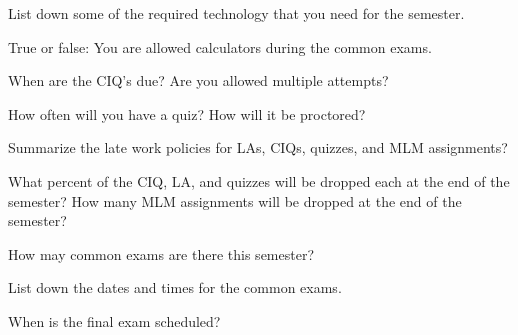 \documentclass{exam}
\numberwithin{equation}{section} %
\numberwithin{figure}{section} %
\numberwithin{table}{section} %
\begin{document}
\begin{questions}
\question List down some of the required technology that you need for the semester.
\begin{solution}[\stretch{2}]

\end{solution}

\question True or false: You are allowed calculators during the common exams.
\begin{solution}[\stretch{1}]

\end{solution}

\question When are the CIQ's due? Are you allowed multiple attempts?%
\begin{solution}[\stretch{1}]

\end{solution}

\question How often will you have a quiz? How will it be proctored?
\begin{solution}[\stretch{1}]

\end{solution}

\newpage

\question Summarize the late work policies for LAs, CIQs, quizzes, and MLM assignments?
\begin{solution}[\stretch{2}]

\end{solution}

\question What percent of the CIQ, LA, and quizzes will be dropped each at the end of the semester? How many MLM assignments will be dropped at the end of the semester?
\begin{solution}[\stretch{1}]

\end{solution}


\question How may common exams are there this semester?
\begin{solution}[\stretch{1}]

\end{solution}

\question List down the dates and times for the common exams. 
\begin{solution}[\stretch{2}]

\end{solution}

\question When is the final exam scheduled?
\begin{solution}[\stretch{1}]

\end{solution}


\end{questions}
\end{document}
